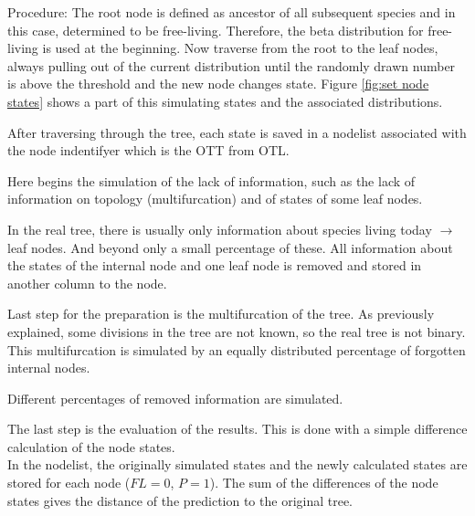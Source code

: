     Procedure: The root node is defined as ancestor of all subsequent species and in this case, 
      determined to be free-living. Therefore, the beta distribution for free-living is used at the 
      beginning. Now traverse from the root to the leaf nodes, always pulling out of the current 
      distribution until the randomly drawn number is above the threshold and the new node changes 
      state. Figure \ref{fig:set node states} shows a part of this simulating states and the 
      associated distributions.

    After traversing through the tree, each state is saved in a nodelist associated with the node 
      indentifyer which is the OTT from OTL.

    Here begins the simulation of the lack of information, such as the lack of information on topology 
      (multifurcation) and of states of some leaf nodes.

    In the real tree, there is usually only information about species living today $\rightarrow$ leaf 
      nodes. And beyond only a small percentage of these. All information about the states of the 
      internal node and one leaf node is removed and stored in another column to the node.

    Last step for the preparation is the multifurcation of the tree. As previously explained, some 
      divisions in the tree are not known, so the real tree is not binary. This multifurcation is 
      simulated by an equally distributed percentage of forgotten internal nodes.
    
    Different percentages of removed information are simulated.
  
    The last step is the evaluation of the results. This is done with a simple difference calculation 
      of the node states. \\
    In the nodelist, the originally simulated states and the newly calculated states are stored for 
      each node ($FL = 0$, $P = 1$). The sum of the differences of the node states gives the distance 
      of the prediction to the original tree.

